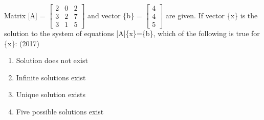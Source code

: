     \item Matrix [A] = $\begin{bmatrix} 2&0&2\\3&2&7\\3&1&5\end{bmatrix}$ and vector \{b\} = $\begin{bmatrix}4\\4\\5\end{bmatrix}$ are given. If vector \{x\} is the solution to the system of equations [A]\{x\}=\{b\}, which of the following is true for \{x\}: \hfill (2017)
    \begin{enumerate}[label=(\Alph*)]
        \item Solution does not exist
        \item Infinite solutions exist
        \item Unique solution exists 
        \item Five possible solutions exist 
    \end{enumerate} 

